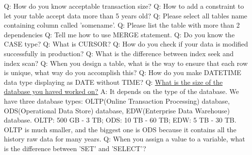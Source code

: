 \documentclass[a4paper,11pt]{article}
\begin{document}
\noindent 
Q: How do you know acceptable transaction size? \newline \newline
\noindent 
Q: How to add a constraint to let your table accept data more than 5 years old? \newline \newline
\noindent 
Q: Please select all tables name containing column called 'somename'. \newline \newline
\noindent 
Q: Please list the table with more than 2 dependencies \newline \newline
\noindent 
Q: Tell me how to use MERGE statement. \newline \newline
\noindent 
Q: Do you know the CASE type? \newline \newline
\noindent 
Q: What is CURSOR? \newline \newline
\noindent 
Q: How do you check if your data is modified successfully in production? \newline \newline
\noindent 
Q: What is the difference between index seek and index scan? \newline \newline
\noindent 
Q: When you design a table, what is the way to ensure that each row is unique, what way do you accomplish this? \newline \newline
\noindent 
Q: How do you make DATETIME data type displaying as DATE without TIME? \newline \newline
\noindent 
Q: \ul{What is the size of the database you haved worked on?} \newline
A: It depends on the type of the database. We have three database types: OLTP(Online Transaction Processing) database, ODS(Operational Data Store) database, EDW(Enterprise Data Warehouse) database. OLTP: 500 GB - 3 TB; ODS: 10 TB - 60 TB; EDW: 5 TB - 30 TB. OLTP is much smaller, and the biggest one is ODS because it contains all the history raw data for many years.\newline \newline
\noindent 
Q: When you assign a value to a variable, what is the difference between 'SET' and 'SELECT'? \newline \newline
\end{document}
